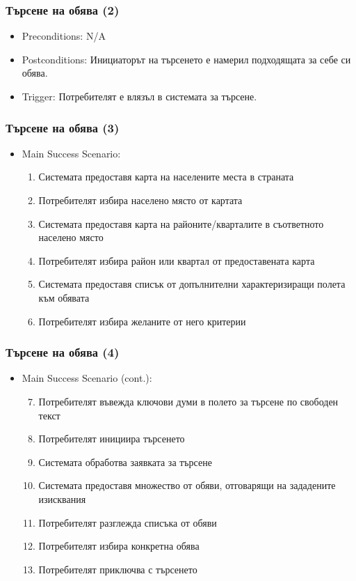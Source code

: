 \documentclass[12pt]{beamer}
\begin{document}
\begin{frame}[fragile]
\frametitle{Търсене на обява (2)}
\begin{itemize}
	\item Preconditions: N/A
	\item Postconditions: Инициаторът на търсенето е намерил подходящата за себе си обява.
	\item Trigger: Потребителят е влязъл в системата за търсене.
\end{itemize}
\end{frame}

\begin{frame}[fragile]
\frametitle{Търсене на обява (3)}
\begin{itemize}
	\item {Main Success Scenario:
		\begin{enumerate}
      \item Системата предоставя карта на населените места в страната
      \item Потребителят избира населено място от картата
      \item Системата предоставя карта на районите/кварталите в съответното населено място
      \item Потребителят избира район или квартал от предоставената карта
      \item Системата предоставя списък от допълнителни характеризиращи полета към обявата
      \item Потребителят избира желаните от него критерии
		\end{enumerate}
	}	
\end{itemize}
\end{frame}

\begin{frame}[fragile]
\frametitle{Търсене на обява (4)}
\begin{itemize}
  \item {Main Success Scenario (cont.):
    \begin{enumerate}
      \setcounter{enumi}{6}
      \item Потребителят въвежда ключови думи в полето за търсене по свободен текст
			\item Потребителят инициира търсенето
			\item Системата обработва заявката за търсене
			\item Системата предоставя множество от обяви, отговарящи на зададените изисквания
			\item Потребителят разглежда списъка от обяви
			\item Потребителят избира конкретна обява
			\item Потребителят приключва с търсенето
    \end{enumerate}
  }
\end{itemize}
\end{frame}
\end{document}
